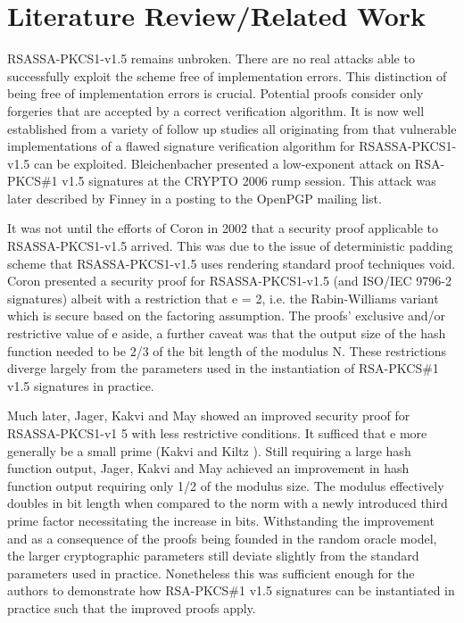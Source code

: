\documentclass[]{final_report}
\theoremstyle{definition}
\begin{document}
 
\chapter{Literature Review/Related Work}
RSASSA-PKCS1-v1.5 remains unbroken. There are no real attacks able to successfully exploit the scheme free of implementation errors. This distinction of being free of implementation errors is crucial. Potential proofs consider only forgeries that are accepted by a correct verification algorithm. It is now well established from a variety of follow up studies all originating from \cite{bleichenbacher1998chosen} that vulnerable implementations of a flawed signature verification algorithm for RSASSA-PKCS1-v1.5 can be exploited. Bleichenbacher presented a low-exponent attack on RSA-PKCS\#1 v1.5 signatures at the CRYPTO 2006 rump session. This attack was later described by Finney \cite{finney2006bleichenbacher} in a posting to the OpenPGP mailing list. 

It was not until the efforts of Coron \cite{coron2002security} in 2002 that a security proof applicable to RSASSA-PKCS1-v1.5 arrived. This was due to the issue of deterministic padding scheme that RSASSA-PKCS1-v1.5 uses rendering standard proof techniques void. Coron presented a security proof for RSASSA-PKCS1-v1.5 (and ISO/IEC 9796-2 signatures) albeit with a restriction that e = 2, i.e. the Rabin-Williams variant \cite{coron2002security} which is secure based on the factoring assumption. 
The proofs' exclusive and/or restrictive value of e aside, a further caveat was that the output size of the hash function needed to be 2/3 of the bit length of the modulus N. These restrictions diverge largely from the parameters used in the instantiation of RSA-PKCS\#1 v1.5 signatures in practice. 

Much later, Jager, Kakvi and May \cite{jager2018security} showed an improved security proof for RSASSA-PKCS1-v1 5 with less restrictive conditions.
It sufficed that e more generally be a small prime (Kakvi and Kiltz \cite{kakvi2018optimal}). Still requiring a large hash function output, Jager, Kakvi and May achieved an improvement in hash function output requiring only 1/2 of the modulus size. The modulus effectively doubles in bit length when compared to the norm with a newly introduced third prime factor necessitating the increase in bits.
Withstanding the improvement and as a consequence of the proofs being founded in the random oracle model, the larger cryptographic parameters still deviate slightly from the standard parameters used in practice. Nonetheless this was sufficient enough for the authors to demonstrate how RSA-PKCS\#1 v1.5 signatures can be instantiated in practice such that the improved proofs apply. 
\end{document}
